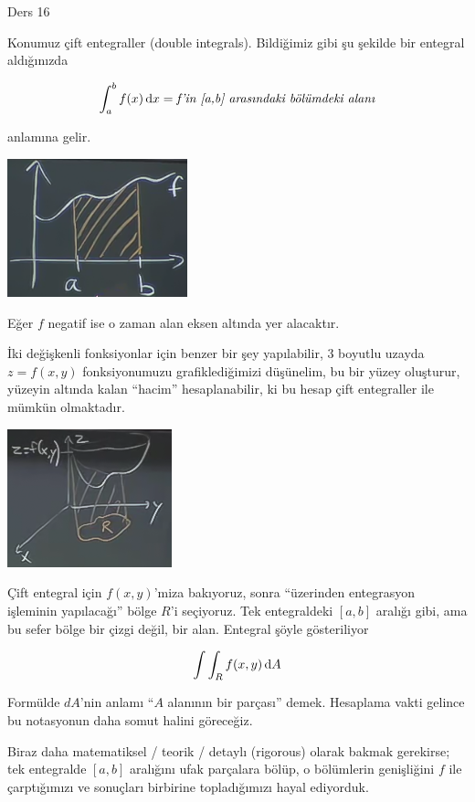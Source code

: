 \documentclass[12pt,fleqn]{article}\usepackage{../../common}
\begin{document}
Ders 16

Konumuz çift entegraller (double integrals). Bildiğimiz gibi şu şekilde bir
entegral aldığınızda

$$ \int_a^bf(x) \,\mathrm{d} x = \textit{f'in [a,b] arasındaki bölümdeki alanı} $$

anlamına gelir. 

\begin{center}
\includegraphics[height=4cm]{16_1.png}
\end{center}

Eğer $f$ negatif ise o zaman alan eksen altında yer alacaktır. 

İki değişkenli fonksiyonlar için benzer bir şey yapılabilir, 3 boyutlu uzayda
$z=f(x,y)$ fonksiyonumuzu grafiklediğimizi düşünelim, bu bir yüzey oluşturur,
yüzeyin altında kalan ``hacim'' hesaplanabilir, ki bu hesap çift entegraller ile
mümkün olmaktadır.

\begin{center}
\includegraphics[height=4cm]{16_2.png}
\end{center}

Çift entegral için $f(x,y)$'miza bakıyoruz, sonra ``üzerinden entegrasyon
işleminin yapılacağı'' bölge $R$'i seçiyoruz. Tek entegraldeki $[a,b]$ aralığı
gibi, ama bu sefer bölge bir çizgi değil, bir alan. Entegral şöyle gösteriliyor

$$ \int \int_R f(x,y) \,\mathrm{d} A $$

Formülde $dA$'nin anlamı ``$A$ alanının bir parçası'' demek. Hesaplama vakti
gelince bu notasyonun daha somut halini göreceğiz.

Biraz daha matematiksel / teorik / detaylı (rigorous) olarak bakmak gerekirse;
tek entegralde $[a,b]$ aralığını ufak parçalara bölüp, o bölümlerin genişliğini
$f$ ile çarptığımızı ve sonuçları birbirine topladığımızı hayal ediyorduk.
\end{document}
